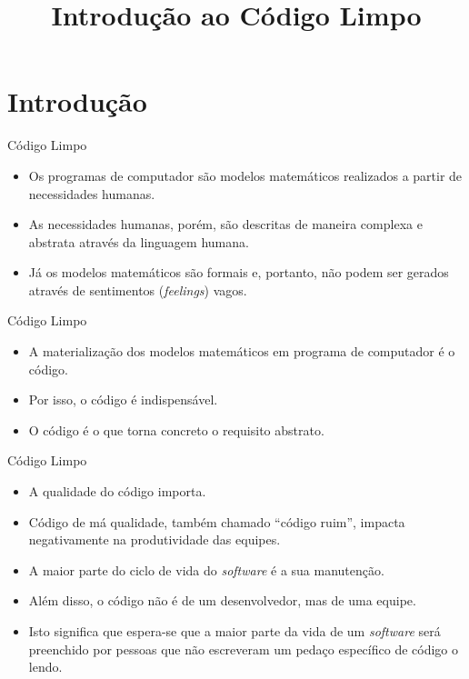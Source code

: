\documentclass[11pt]{beamer}
\title{Introdução ao Código Limpo}
\author{}
\date{}
\begin{document}
  \begin{frame}[plain]
    \titlepage
  \end{frame}

	\section{Introdução}

  \begin{frame}{Código Limpo}
    \begin{itemize}
      \item Os programas de computador são modelos matemáticos realizados a partir de necessidades humanas.
      \item As necessidades humanas, porém, são descritas de maneira complexa e abstrata através da linguagem humana.
      \item Já os modelos matemáticos são formais e, portanto, não podem ser gerados através de sentimentos (\textit{feelings}) vagos.
    \end{itemize}
  \end{frame}

  \begin{frame}{Código Limpo}
    \begin{itemize}
      \item A materialização dos modelos matemáticos em programa de computador é o código.
      \item Por isso, o código é indispensável.
      \item O código é o que torna concreto o requisito abstrato.
    \end{itemize}
  \end{frame}

  \begin{frame}{Código Limpo}
    \begin{itemize}
      \item A qualidade do código importa.
      \item Código de má qualidade, também chamado ``código ruim'', impacta negativamente na produtividade das equipes.
      \item A maior parte do ciclo de vida do \textit{software} é a sua manutenção.
      \item Além disso, o código não é de um desenvolvedor, mas de uma equipe.
      \item Isto significa que espera-se que a maior parte da vida de um \textit{software} será preenchido por pessoas que não escreveram um pedaço específico de código o lendo. 
    \end{itemize}
  \end{frame}
\end{document}
